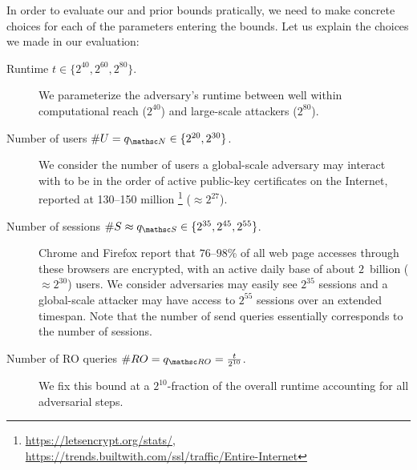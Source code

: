 In order to evaluate our and prior bounds pratically, we need to make concrete choices for each of the parameters entering the bounds.
Let us explain the choices we made in our evaluation:
\begin{description}
	\item[Runtime $t \in \{2^{40}, 2^{60}, 2^{80}\}$.]
	We parameterize the adversary's runtime between well within computational reach ($2^{40}$) and large-scale attackers ($2^{80}$).
	
	\item[Number of users $\#U = \qNewUser \in \{2^{20}, 2^{30}\}$.]
	We consider the number of users a global-scale adversary may interact with to be in the order of active public-key certificates on the Internet, reported at 130--150 million%
	\footnote{\url{https://letsencrypt.org/stats/},						%
	\url{https://trends.builtwith.com/ssl/traffic/Entire-Internet}}		%
	($\approx 2^{27}$).
	
	\item[Number of sessions $\#S \approx \qSend \in \{2^{35}, 2^{45}, 2^{55}\}$.]
	Chrome%
	and Firefox%
	report that $76$--$98$\% of all web page accesses through these browsers are encrypted,
	with an active daily base of about $2$~billion ($\approx 2^{30}$) users.%
	We consider adversaries may easily see $2^{35}$ sessions and a global-scale attacker may have access to $2^{55}$ sessions over an extended timespan.
	Note that the number of send queries essentially corresponds to the number of sessions.
	
	\item[Number of RO queries $\#RO = \qRO = \tfrac{t}{2^{10}}$.]
	We fix this bound at a $2^{10}$-fraction of the overall runtime accounting for all adversarial steps.
	

\end{description}
